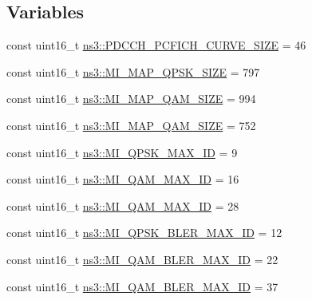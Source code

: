 \subsection*{Variables}
\begin{DoxyCompactItemize}
\item 
const uint16\+\_\+t \hyperlink{namespacens3_a2e25e67eb717794919aef954cb72766e}{ns3\+::\+P\+D\+C\+C\+H\+\_\+\+P\+C\+F\+I\+C\+H\+\_\+\+C\+U\+R\+V\+E\+\_\+\+S\+I\+ZE} = 46
\item 
const uint16\+\_\+t \hyperlink{namespacens3_aae59b755610c3c0be0b839e4dcc933d6}{ns3\+::\+M\+I\+\_\+\+M\+A\+P\+\_\+\+Q\+P\+S\+K\+\_\+\+S\+I\+ZE} = 797
\item 
const uint16\+\_\+t \hyperlink{namespacens3_a9afdb721d53db6fa713ad6255ba2be6f}{ns3\+::\+M\+I\+\_\+\+M\+A\+P\+\_\+Q\+A\+M\+\_\+\+S\+I\+ZE} = 994
\item 
const uint16\+\_\+t \hyperlink{namespacens3_a5d06e4605b670cca6c6a4a64cf5b33d0}{ns3\+::\+M\+I\+\_\+\+M\+A\+P\+\_\+Q\+A\+M\+\_\+\+S\+I\+ZE} = 752
\item 
const uint16\+\_\+t \hyperlink{namespacens3_a1840b801e1da3fdf41acd19d0d69b364}{ns3\+::\+M\+I\+\_\+\+Q\+P\+S\+K\+\_\+\+M\+A\+X\+\_\+\+ID} = 9
\item 
const uint16\+\_\+t \hyperlink{namespacens3_ae747a3e135187138f53f61a9cbc17bb0}{ns3\+::\+M\+I\+\_\+Q\+A\+M\+\_\+\+M\+A\+X\+\_\+\+ID} = 16
\item 
const uint16\+\_\+t \hyperlink{namespacens3_ad631b53e9b9bbd85d0cd82beb8f78123}{ns3\+::\+M\+I\+\_\+Q\+A\+M\+\_\+\+M\+A\+X\+\_\+\+ID} = 28
\item 
const uint16\+\_\+t \hyperlink{namespacens3_a7a480b6e40e87d1dd287d52fc68915c6}{ns3\+::\+M\+I\+\_\+\+Q\+P\+S\+K\+\_\+\+B\+L\+E\+R\+\_\+\+M\+A\+X\+\_\+\+ID} = 12
\item 
const uint16\+\_\+t \hyperlink{namespacens3_ab199ca864ed96682df574de1580b3c8c}{ns3\+::\+M\+I\+\_\+Q\+A\+M\+\_\+\+B\+L\+E\+R\+\_\+\+M\+A\+X\+\_\+\+ID} = 22
\item 
const uint16\+\_\+t \hyperlink{namespacens3_a6ee7c05ab74c248dc73593711ce0c4be}{ns3\+::\+M\+I\+\_\+Q\+A\+M\+\_\+\+B\+L\+E\+R\+\_\+\+M\+A\+X\+\_\+\+ID} = 37
\end{DoxyCompactItemize}
